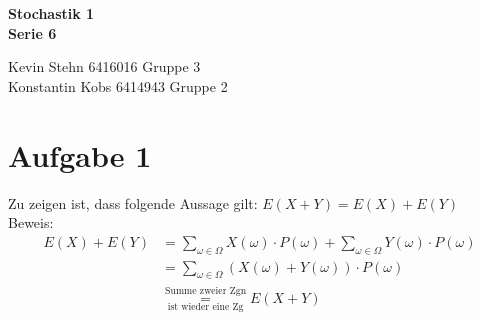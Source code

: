 \documentclass[10pt,a4paper]{article}
\begin{document}
\begin{center}
\textbf{Stochastik 1 \\ Serie 6\\}
\end{center}

\begin{flushright}
Kevin Stehn 6416016 Gruppe 3 \\
Konstantin Kobs 6414943 Gruppe 2
\end{flushright}

\section*{Aufgabe 1}
Zu zeigen ist, dass folgende Aussage gilt: $E(X+Y) = E(X) + E(Y)$\\
Beweis:
\begin{align*}
E(X) + E(Y) &= \sum_{\omega \in \Omega} X(\omega) \cdot P({\omega}) + \sum_{\omega \in \Omega} Y(\omega) \cdot P({\omega})\\
&= \sum_{\omega \in \Omega} (X(\omega) + Y(\omega)) \cdot P({\omega})\\
&\overset{\text{Summe zweier Zgn}}{\underset{\text{ist wieder eine Zg}}{=}} E(X+Y)
\end{align*}
\end{document}
